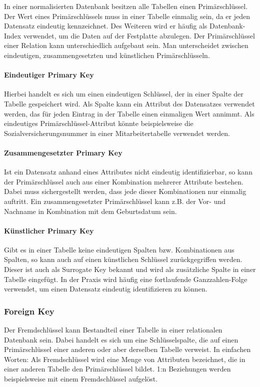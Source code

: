 In einer normalisierten Datenbank besitzen alle Tabellen einen Primärschlüssel.
Der Wert eines Primärschlüssels muss in einer Tabelle einmalig sein, da er jeden Datensatz eindeutig kennzeichnet. Des Weiteren wird er häufig als Datenbank-Index verwendet, um die Daten auf der Festplatte abzulegen. Der Primärschlüssel einer Relation kann unterschiedlich aufgebaut sein. Man unterscheidet zwischen eindeutigen, zusammengesetzten und künstlichen Primärschlüsseln.

\paragraph{Eindeutiger Primary Key}
Hierbei handelt es sich um einen eindeutigen Schlüssel, der in einer Spalte der Tabelle gespeichert wird. Als Spalte kann ein Attribut des Datensatzes verwendet werden, das für jeden Eintrag in der Tabelle einen einmaligen Wert annimmt. Als eindeutiges Primärschlüssel-Attribut könnte beispielsweise die Sozialversicherungsnummer in einer Mitarbeitertabelle verwendet werden.

\paragraph{Zusammengesetzter Primary Key}
Ist ein Datensatz anhand eines Attributes nicht eindeutig identifizierbar, so kann der Primärschlüssel auch aus einer Kombination mehrerer Attribute bestehen. Dabei muss sichergestellt werden, dass jede dieser Kombinationen nur einmalig auftritt. Ein zusammengesetzter Primärschlüssel kann z.B. der Vor- und Nachname in Kombination mit dem Geburtsdatum sein.

\paragraph{Künstlicher Primary Key}
Gibt es in einer Tabelle keine eindeutigen Spalten bzw. Kombinationen aus Spalten, so kann auch auf einen künstlichen Schlüssel zurückgegriffen werden. Dieser ist auch als Surrogate Key bekannt und wird als zusätzliche Spalte in einer Tabelle eingefügt. In der Praxis wird häufig eine fortlaufende Ganzzahlen-Folge verwendet, um einen Datensatz eindeutig identifizieren zu können.

\subsubsection{Foreign Key}

Der Fremdschlüssel kann Bestandteil einer Tabelle in einer relationalen Datenbank sein. Dabei handelt es sich um eine Schlüsselspalte, die auf einen Primärschlüssel einer anderen oder aber derselben Tabelle verweist. In einfachen Worten: Als Fremdschlüssel wird eine Menge von Attributen bezeichnet, die in einer anderen Tabelle den Primärschlüssel bildet. 1:n Beziehungen werden beispielsweise mit einem Fremdschlüssel aufgelöst. 

